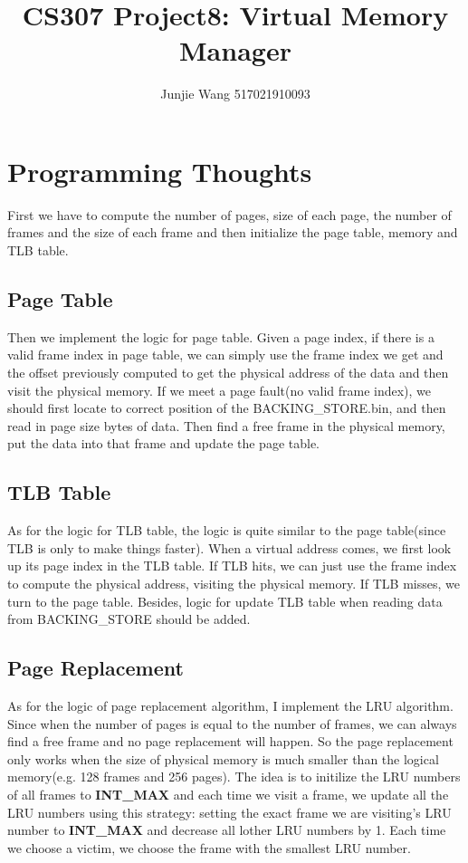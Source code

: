 \documentclass[12pt]{extarticle}
\title{CS307 Project8: Virtual Memory Manager}
\author{Junjie Wang 517021910093}
\newcommand{\<}{\langle}
\renewcommand{\>}{\rangle}
\theoremstyle{definition}
\begin{document}
	\maketitle
	\section{Programming Thoughts}
	First we have to compute the number of pages, size of each page, the number of frames and the size of each frame and then initialize the page table, memory and TLB table.
	\subsection{Page Table}
	Then we implement the logic for page table. Given a page index, if there is a valid frame index in page table, we can simply use the frame index we get and the offset previously computed to get the physical address of the data and then visit the physical memory. If we meet a page fault(no valid frame index), we should first locate to correct position of the BACKING\_STORE.bin, and then read in page size bytes of data. Then find a free frame in the physical memory, put the data into that frame and update the page table. 
	\subsection{TLB Table}
	As for the logic for TLB table, the logic is quite similar to the page table(since TLB is only to make things faster). When a virtual address comes, we first look up its page index in the TLB table. If TLB hits, we can just use the frame index to compute the physical address, visiting the physical memory. If TLB misses, we turn to the page table. Besides, logic for update TLB table when reading  data from BACKING\_STORE should be added.
	\subsection{Page Replacement}
	As for the logic of page replacement algorithm, I implement the LRU algorithm. Since when the number of pages is equal to the number of frames, we can always find a free frame and no page replacement will happen. So the page replacement only works when the size of physical memory is much smaller than the logical memory(e.g. 128 frames and 256 pages). The idea is to initilize the LRU numbers of all frames to \textbf{INT\_MAX} and each time we visit a frame, we update all the LRU numbers using this strategy: setting the exact frame we are visiting's LRU number to \textbf{INT\_MAX} and decrease all lother LRU numbers by 1. Each time we choose a victim, we choose the frame with the smallest LRU number.
\end{document}
